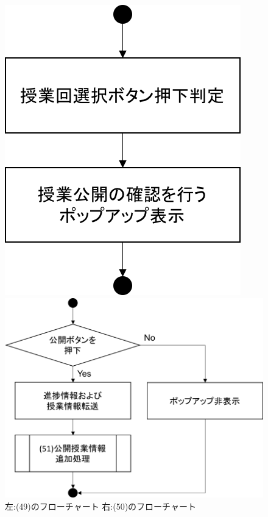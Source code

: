 \begin{figure}[htbp]
 \begin{minipage}{0.5\hsize}
  \begin{center}
   \includegraphics[width=0.4\linewidth,clip]{./img/flow/49.png}
  \end{center}
 \end{minipage}
 \begin{minipage}{0.5\hsize}
  \begin{center}
   \includegraphics[width=0.8\linewidth,clip]{./img/flow/50.png}
  \end{center}
 \end{minipage}
 \caption{左:(49)のフローチャート 右:(50)のフローチャート}\label{fig:49to50}
\end{figure}

